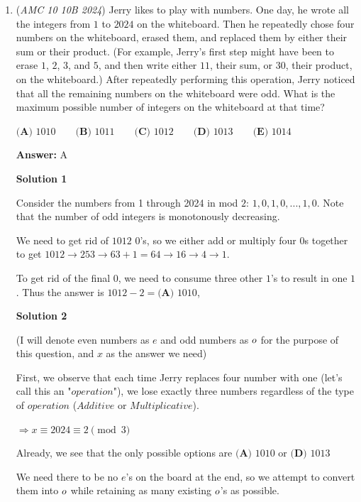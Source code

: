 \begin{enumerate}
 


	\item (\textit{AMC 10 10B 2024}) Jerry likes to play with numbers. One day, he wrote all the integers from $1$ to $2024$ on the whiteboard. Then he repeatedly chose four numbers on the whiteboard, erased them, and replaced them by either their sum or their product. (For example, Jerry's first step might have been to erase $1$, $2$, $3$, and $5$, and then write either $11$, their sum, or $30$, their product, on the whiteboard.) After repeatedly performing this operation, Jerry noticed that all the remaining numbers on the whiteboard were odd. What is the maximum possible number of integers on the whiteboard at that time?


 $\textbf{(A) } 1010 \qquad \textbf{(B) } 1011 \qquad \textbf{(C) } 1012 \qquad \textbf{(D) } 1013 \qquad \textbf{(E) } 1014$

 \textbf{Answer: }A



\textbf{Solution 1}

Consider the numbers from 1 through 2024 in mod $2$: $1,0,1,0,...,1,0$. Note that the number of odd integers is monotonously decreasing.

 We need to get rid of $1012$ $0$'s, so we either add or multiply four $0$s together to get $1012\rightarrow 253 \rightarrow 63+1=64 \rightarrow 16 \rightarrow 4 \rightarrow 1.$

 To get rid of the final $0$, we need to consume three other $1$'s to result in one $1$. Thus the answer is $1012-2=\boxed{\textbf{(A) } 1010 }$,

 



\textbf{Solution 2}

(I will denote even numbers as $e$ and odd numbers as $\normalsize o$ for the purpose of this question, and $x$ as the answer we need)

 First, we observe that each time Jerry replaces four number with one (let's call this an "$operation$"), we lose exactly three numbers regardless of the type of $operation$ ($Additive$ or $Multiplicative$).

 $\Rightarrow x \equiv 2024 \equiv 2\pmod3$

 Already, we see that the only possible options are $\textbf{(A) } 1010$ or $\textbf{(D) } 1013$

 We need there to be no $e$'s on the board at the end, so we attempt to convert them into $\normalsize o$ while retaining as many existing $\normalsize o$'s as possible.


\end{enumerate}

